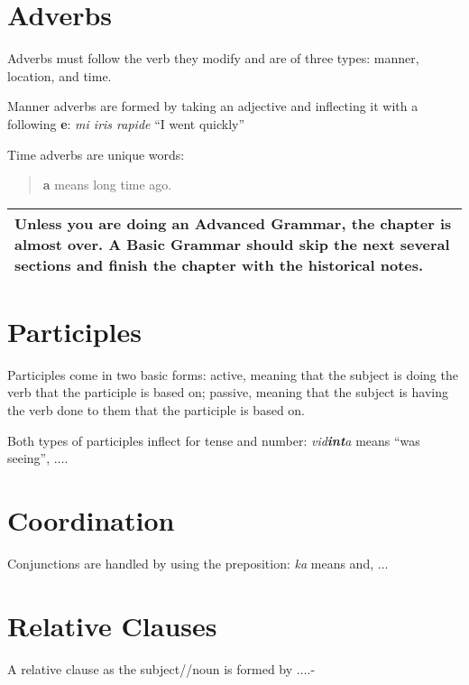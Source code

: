 \section{Adverbs}

Adverbs must follow the verb they modify and are of three types: manner, location, and time.

Manner adverbs are formed by taking an adjective and inflecting it with a following \textbf{e}:
\textit{mi iris rapide} ``I went quickly''

Time adverbs are unique words:

\begin{quote}
\textbf{a} means long time ago.\\
\end{quote}

\begin{center}
\begin{tabular}{|p{}|}
\hline
Unless you are doing an Advanced Grammar, the chapter is almost over.
A Basic Grammar should skip the next several sections and finish the chapter with the historical notes.
\\\hline
\end{tabular}
\end{center}

\section{Participles}

Participles come in two basic forms:
active, meaning that the subject is doing the verb that the participle is based on;
passive, meaning that the subject is having the verb done to them that the participle is based on.

Both types of participles inflect for tense and number:
\textit{vid\textbf{int}a} means ``was seeing'',
$\ldots$.

\section{Coordination}

Conjunctions are handled by using the preposition:
\textit{ka} means and,
$\ldots$

\section{Relative Clauses}

A relative clause as the subject//noun is formed by $\ldots$.-

